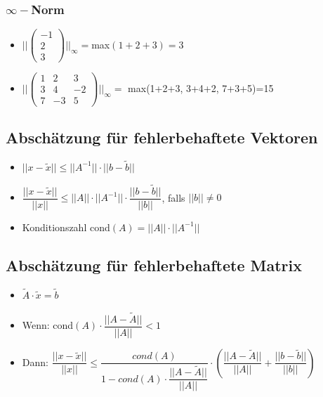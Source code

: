 \documentclass[8pt,a4paper]{scrartcl}
\begin{document}
\begin{multicols*}{3}
				\subsubsection{$\infty-$Norm}			
					\begin{itemize}\itemsep0pt	
						\item $||\begin{pmatrix}-1\\2\\3\end{pmatrix}||_{\infty} = $max$(1+2+3)=3$
						\item $||\begin{pmatrix}1&2&3\\3&4&-2\\7&-3&5\end{pmatrix}||_{\infty} = $ max(1+2+3, 3+4+2, 7+3+5)=15
					\end{itemize}
			
			\subsection{Abschätzung für fehlerbehaftete Vektoren}
				\begin{itemize}\itemsep0pt	
					\item $||x-\tilde{x}|| \leq ||A^{-1}||\cdot ||b-\tilde{b}||$
					\item $\dfrac{||x-\tilde{x}||}{||x||} \leq ||A||\cdot ||A^{-1}||\cdot \dfrac{||b-\tilde{b}||}{||b||}$, falls $||b||\neq0$
					\item Konditionszahl cond$(A) = ||A||\cdot ||A^{-1}||$
				\end{itemize}

			\subsection{Abschätzung für fehlerbehaftete Matrix}
				\begin{itemize}\itemsep0pt	
					\item $\tilde{A} \cdot \tilde{x} = \tilde{b}$
					\item Wenn: cond$(A)\cdot \dfrac{||A-\tilde{A}||}{||A||} < 1$
					\item Dann: $\dfrac{||x-\tilde{x}||}{||x||} \leq \dfrac{cond(A)}{1-cond(A)\cdot \dfrac{||A-\tilde{A}||}{||A||}}\cdot (\dfrac{||A-\tilde{A}||}{||A||} + \dfrac{||b-\tilde{b}||}{||b||} ) $
				\end{itemize}
				

\end{multicols*}
\end{document}

